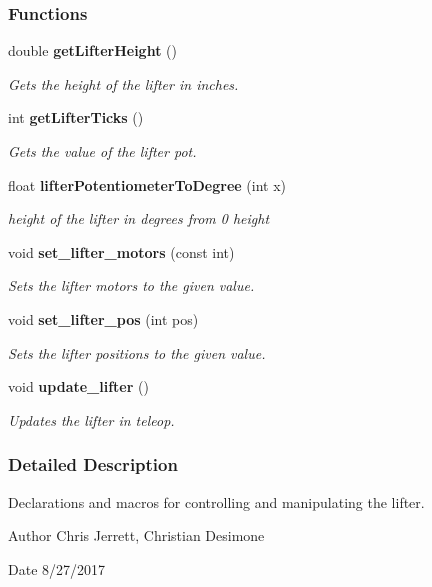 \subsubsection*{Functions}
\begin{DoxyCompactItemize}
\item 
double \textbf{ get\+Lifter\+Height} ()
\begin{DoxyCompactList}\small\item\em Gets the height of the lifter in inches. \end{DoxyCompactList}\item 
int \textbf{ get\+Lifter\+Ticks} ()
\begin{DoxyCompactList}\small\item\em Gets the value of the lifter pot. \end{DoxyCompactList}\item 
float \textbf{ lifter\+Potentiometer\+To\+Degree} (int x)
\begin{DoxyCompactList}\small\item\em height of the lifter in degrees from 0 height \end{DoxyCompactList}\item 
void \textbf{ set\+\_\+lifter\+\_\+motors} (const int)
\begin{DoxyCompactList}\small\item\em Sets the lifter motors to the given value. \end{DoxyCompactList}\item 
void \textbf{ set\+\_\+lifter\+\_\+pos} (int pos)
\begin{DoxyCompactList}\small\item\em Sets the lifter positions to the given value. \end{DoxyCompactList}\item 
void \textbf{ update\+\_\+lifter} ()
\begin{DoxyCompactList}\small\item\em Updates the lifter in teleop. \end{DoxyCompactList}\end{DoxyCompactItemize}


\subsubsection{Detailed Description}
Declarations and macros for controlling and manipulating the lifter. 

\begin{DoxyAuthor}{Author}
Chris Jerrett, Christian Desimone 
\end{DoxyAuthor}
\begin{DoxyDate}{Date}
8/27/2017 
\end{DoxyDate}


